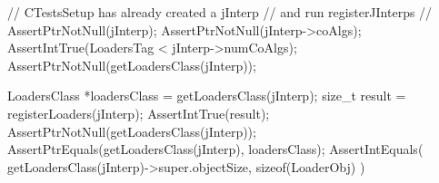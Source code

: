 
\startCTest
  // CTestsSetup has already created a jInterp 
  // and run registerJInterps
  //
  AssertPtrNotNull(jInterp);
  AssertPtrNotNull(jInterp->coAlgs);
  AssertIntTrue(LoadersTag < jInterp->numCoAlgs);
  AssertPtrNotNull(getLoadersClass(jInterp));
  
  LoadersClass *loadersClass = getLoadersClass(jInterp);
  size_t result = registerLoaders(jInterp);
  AssertIntTrue(result);
  AssertPtrNotNull(getLoadersClass(jInterp));
  AssertPtrEquals(getLoadersClass(jInterp), loadersClass);
  AssertIntEquals(
    getLoadersClass(jInterp)->super.objectSize,
    sizeof(LoaderObj)
  )
\stopCTest
\stopTestCase
\stopTestSuite
